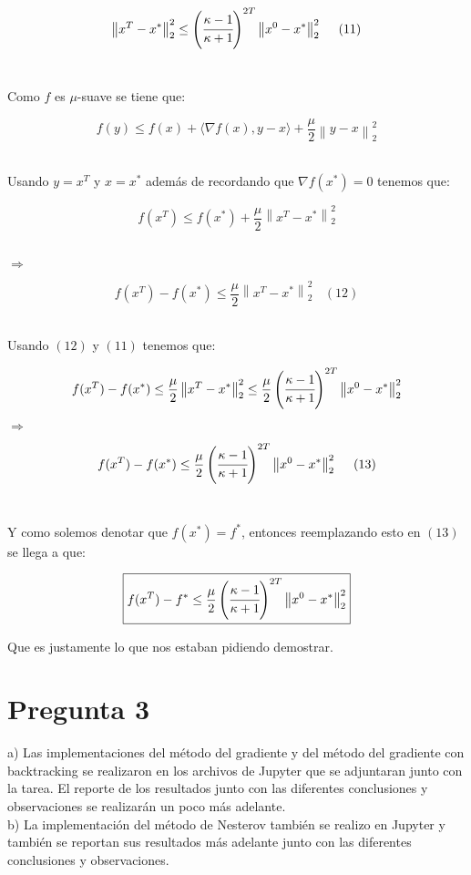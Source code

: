 \documentclass[11pt]{article}
\begin{document}
\[ \left\| x^{T} - x^{*} \right\|_2^2 \leq  \left( \cfrac{\kappa - 1}{\kappa + 1}  \right)^{2T}  \left\| x^{0} - x^{*} \right\|_2^2 \ \ \ \ (11)  \] \

Como $ f $ es $ \mu $-suave se tiene que:

\[ f(y) \leq f(x) + \langle \nabla f(x),y-x \rangle + \frac{\mu}{2} \left\| y-x \right\|_2^2  \] \

Usando $ y = x^{T} $ y $ x = x^{*} $ además de recordando que $ \nabla f(x^{*}) = 0 $ tenemos que: \

\[ f(x^T) \leq f(x^{*}) + \frac{\mu}{2} \left\| x^T-x^{*} \right\|_2^2  \] \

$ \Rightarrow $ 

\[ f(x^T) - f(x^{*}) \leq  \frac{\mu}{2} \left\| x^T-x^{*} \right\|_2^2 \ \ \ \ (12) \] \

Usando $(12)$ y $(11)$ tenemos que:

\[ f(x^T) - f(x^{*}) \leq  \frac{\mu}{2} \left\| x^T-x^{*} \right\|_2^2 \leq \frac{\mu}{2} \left( \cfrac{\kappa - 1}{\kappa + 1}  \right)^{2T}  \left\| x^{0} - x^{*} \right\|_2^2 \]

$ \Rightarrow $

\[ f(x^T) - f(x^{*}) \leq  \frac{\mu}{2} \left( \cfrac{\kappa - 1}{\kappa + 1}  \right)^{2T}  \left\| x^{0} - x^{*} \right\|_2^2 \ \ \ \ (13) \] \

Y como solemos denotar que $ f(x^{*}) = f^{*} $, entonces reemplazando esto en $ (13) $ se llega a que:

\[ \boxed{f(x^T) - f^{*} \leq  \frac{\mu}{2} \left( \cfrac{\kappa - 1}{\kappa + 1}  \right)^{2T}  \left\| x^{0} - x^{*} \right\|_2^2} \]

Que es justamente lo que nos estaban pidiendo demostrar. \\

\hrulefill

\section*{Pregunta 3}

a) Las implementaciones del método del gradiente y del método del gradiente con backtracking se realizaron en los archivos de Jupyter que se adjuntaran junto con la tarea. El reporte de los resultados junto con las diferentes conclusiones y observaciones se realizarán un poco más adelante. \\

b) La implementación del método de Nesterov también se realizo en Jupyter y también se reportan sus resultados más adelante junto con las diferentes conclusiones y observaciones. \\
\end{document}
